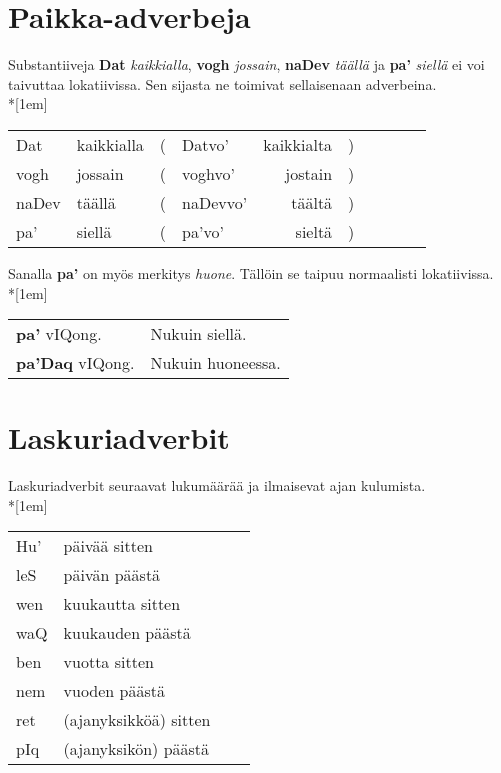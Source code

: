 \documentclass{book}
\begin{document}
\section{Paikka-adverbeja}

Substantiiveja \textbf{Dat} \textit{kaikkialla}, \textbf{vogh} \textit{jossain}, \textbf{naDev} \textit{täällä} ja \textbf{pa'} \textit{siellä} ei voi taivuttaa lokatiivissa.
Sen sijasta ne toimivat sellaisenaan adverbeina.\\*[1em]
\begin{tabular}{Bl Il | r Bl Il l}
    Dat & kaikkialla & ( & Datvo' & kaikkialta & ) \\
    vogh & jossain & ( & voghvo' & jostain & ) \\
    naDev & täällä & ( & naDevvo' & täältä & ) \\
    pa' & siellä & ( & pa'vo' & sieltä & ) \\
\end{tabular}

Sanalla \textbf{pa'} on myös merkitys \textit{huone}.
Tällöin se taipuu normaalisti lokatiivissa.\\*[1em]
\begin{tabular}{l l}
    \textbf{pa'} vIQong. & Nukuin siellä. \\
    \textbf{pa'Daq} vIQong. & Nukuin huoneessa. \\
\end{tabular}

\section{Laskuriadverbit}

Laskuriadverbit seuraavat lukumäärää ja ilmaisevat ajan kulumista.\\*[1em]
\begin{tabular}{Bl Il}
    Hu' & päivää sitten \\
    leS & päivän päästä \\
    wen & kuukautta sitten \\
    waQ & kuukauden päästä \\
    ben & vuotta sitten \\
    nem & vuoden päästä \\
    ret & (ajanyksikköä) sitten \\
    pIq & (ajanyksikön) päästä \\
\end{tabular}
\end{document}
